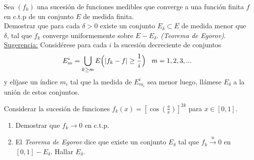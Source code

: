 \documentclass{book}
\newcommand{\nn}{\mathbb{N}}
\begin{document}
\begin{ejer}{} 
Sea $(f_k)$ una sucesión de  funciones medibles que converge a una función finita $f$
en c.t.p de un conjunto $E$ de medida finita. 
\\
Demostrar que para cada $\delta>0$  existe un conjunto
$E_{\delta}\subset E$ de medida menor que $\delta$, tal que $f_k$ converge uniformemente sobre 
$E-E_{\delta}$. 
{\it{(Teorema de Egorov)}}.
\\
\underline{Sugerencia:} Considérese para cada $i$ la 
sucesión decreciente de conjuntos
$$E_m^i=\bigcup_{k\geq m}E\Bigl(|f_k-f|\geq \frac{1}{i}\Bigr) \;\;\;m=1,2,3,...$$
y elíjase un índice $m_i$ tal que la medida de $E_{m_i}^i$ sea menor luego, llámese $E_{\delta}$ a la unión de estos conjuntos.
\end{ejer} 

\begin{ejer}{} 
Considerar la sucesi\'on de funciones $f_k(x)=\left[\cos(\frac{\pi}{x})\right]^{2k}$ para $x \in [0,1]$.
\begin{enumerate}
\item Demostrar que $f_k \to 0$ en c.t.p.
\item El \textit{Teorema de Egorov} dice que existe un conjunto $E_{\delta}$ tal que $f_k \xrightarrow{u} 0$
en $[0,1]-E_{\delta}$. 
Hallar $E_{\delta}$.
\end{enumerate}
\end{ejer}

\end{document}
